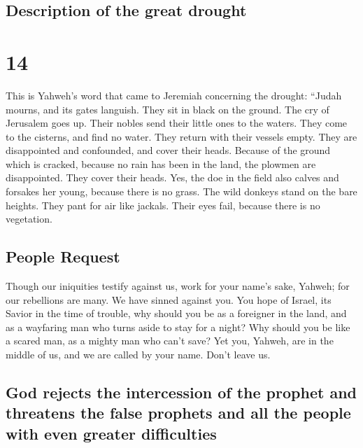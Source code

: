 \hypertarget{description-of-the-great-drought}{%
\subsection{Description of the great
drought}\label{description-of-the-great-drought}}

\hypertarget{section-13}{%
\section{14}\label{section-13}}

 This is Yahweh's word that came to Jeremiah concerning
the drought:  ``Judah mourns, and its gates languish. They
sit in black on the ground. The cry of Jerusalem goes up. 
Their nobles send their little ones to the waters. They come to the
cisterns, and find no water. They return with their vessels empty. They
are disappointed and confounded, and cover their heads. 
Because of the ground which is cracked, because no rain has been in the
land, the plowmen are disappointed. They cover their heads.
 Yes, the doe in the field also calves and forsakes her
young, because there is no grass.  The wild donkeys stand
on the bare heights. They pant for air like jackals. Their eyes fail,
because there is no vegetation.

\hypertarget{people-request}{%
\subsection{People Request}\label{people-request}}

 Though our iniquities testify against us, work for your
name's sake, Yahweh; for our rebellions are many. We have sinned against
you.  You hope of Israel, its Savior in the time of
trouble, why should you be as a foreigner in the land, and as a
wayfaring man who turns aside to stay for a night?  Why
should you be like a scared man, as a mighty man who can't save? Yet
you, Yahweh, are in the middle of us, and we are called by your name.
Don't leave us.

\hypertarget{god-rejects-the-intercession-of-the-prophet-and-threatens-the-false-prophets-and-all-the-people-with-even-greater-difficulties}{%
\subsection{God rejects the intercession of the prophet and threatens
the false prophets and all the people with even greater
difficulties}\label{god-rejects-the-intercession-of-the-prophet-and-threatens-the-false-prophets-and-all-the-people-with-even-greater-difficulties}}

